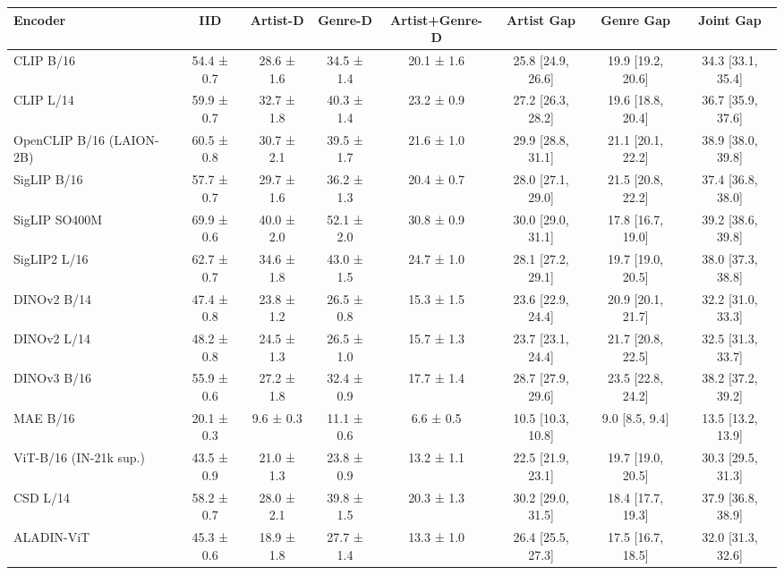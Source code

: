 \begin{tabular}{lccccccc}
\toprule
Encoder & IID & Artist-D & Genre-D & Artist+Genre-D & Artist Gap & Genre Gap & Joint Gap \\
\midrule
CLIP B/16 & 54.4 ± 0.7 & 28.6 ± 1.6 & 34.5 ± 1.4 & 20.1 ± 1.6 & 25.8 [24.9, 26.6] & 19.9 [19.2, 20.6] & 34.3 [33.1, 35.4] \\
CLIP L/14 & 59.9 ± 0.7 & 32.7 ± 1.8 & 40.3 ± 1.4 & 23.2 ± 0.9 & 27.2 [26.3, 28.2] & 19.6 [18.8, 20.4] & 36.7 [35.9, 37.6] \\
OpenCLIP B/16 (LAION-2B) & 60.5 ± 0.8 & 30.7 ± 2.1 & 39.5 ± 1.7 & 21.6 ± 1.0 & 29.9 [28.8, 31.1] & 21.1 [20.1, 22.2] & 38.9 [38.0, 39.8] \\
SigLIP B/16 & 57.7 ± 0.7 & 29.7 ± 1.6 & 36.2 ± 1.3 & 20.4 ± 0.7 & 28.0 [27.1, 29.0] & 21.5 [20.8, 22.2] & 37.4 [36.8, 38.0] \\
SigLIP SO400M & 69.9 ± 0.6 & 40.0 ± 2.0 & 52.1 ± 2.0 & 30.8 ± 0.9 & 30.0 [29.0, 31.1] & 17.8 [16.7, 19.0] & 39.2 [38.6, 39.8] \\
SigLIP2 L/16 & 62.7 ± 0.7 & 34.6 ± 1.8 & 43.0 ± 1.5 & 24.7 ± 1.0 & 28.1 [27.2, 29.1] & 19.7 [19.0, 20.5] & 38.0 [37.3, 38.8] \\
DINOv2 B/14 & 47.4 ± 0.8 & 23.8 ± 1.2 & 26.5 ± 0.8 & 15.3 ± 1.5 & 23.6 [22.9, 24.4] & 20.9 [20.1, 21.7] & 32.2 [31.0, 33.3] \\
DINOv2 L/14 & 48.2 ± 0.8 & 24.5 ± 1.3 & 26.5 ± 1.0 & 15.7 ± 1.3 & 23.7 [23.1, 24.4] & 21.7 [20.8, 22.5] & 32.5 [31.3, 33.7] \\
DINOv3 B/16 & 55.9 ± 0.6 & 27.2 ± 1.8 & 32.4 ± 0.9 & 17.7 ± 1.4 & 28.7 [27.9, 29.6] & 23.5 [22.8, 24.2] & 38.2 [37.2, 39.2] \\
MAE B/16 & 20.1 ± 0.3 & 9.6 ± 0.3 & 11.1 ± 0.6 & 6.6 ± 0.5 & 10.5 [10.3, 10.8] & 9.0 [8.5, 9.4] & 13.5 [13.2, 13.9] \\
ViT-B/16 (IN-21k sup.) & 43.5 ± 0.9 & 21.0 ± 1.3 & 23.8 ± 0.9 & 13.2 ± 1.1 & 22.5 [21.9, 23.1] & 19.7 [19.0, 20.5] & 30.3 [29.5, 31.3] \\
CSD L/14 & 58.2 ± 0.7 & 28.0 ± 2.1 & 39.8 ± 1.5 & 20.3 ± 1.3 & 30.2 [29.0, 31.5] & 18.4 [17.7, 19.3] & 37.9 [36.8, 38.9] \\
ALADIN-ViT & 45.3 ± 0.6 & 18.9 ± 1.8 & 27.7 ± 1.4 & 13.3 ± 1.0 & 26.4 [25.5, 27.3] & 17.5 [16.7, 18.5] & 32.0 [31.3, 32.6] \\
\bottomrule
\end{tabular}
